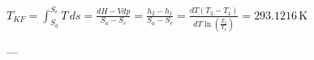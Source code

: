 \( T_{KF} = \int_{S_a}^{S_e} T \, ds = \frac{dH - V dp}{S_a - S_e} = \frac{h_2 - h_1}{S_a - S_e} = \frac{dT (T_2 - T_1)}{dT \ln \left( \frac{T_2}{T_1} \right)} = 293.1216 \, \text{K} \)  

---